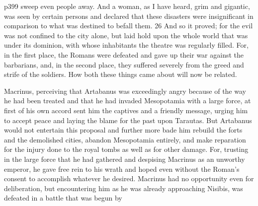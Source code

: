 p399 sweep even people away. And a woman, as I have heard, grim and gigantic, was seen by certain persons and declared that these disasters were insignificant in comparison to what was destined to befall them. 26
And so it proved; for the evil was not confined to the city alone, but laid hold upon the whole world that was under its dominion, with whose inhabitants the theatre was regularly filled. For, in the first place, the Romans were defeated and gave up their war against the barbarians, and, in the second place, they suffered severely from the greed and strife of the soldiers. How both these things came about will now be related.

Macrinus, perceiving that Artabanus was exceedingly angry because of the way he had been treated and that he had invaded Mesopotamia with a large force, at first of his own accord sent him the captives and a friendly message, urging him to accept peace and laying the blame for the past upon Tarautas. But Artabanus would not entertain this proposal and further more bade him rebuild the forts and the demolished cities, abandon Mesopotamia entirely, and make reparation for the injury done to the royal tombs as well as for other damage. For, trusting in the large force that he had gathered and despising Macrinus as an unworthy emperor, he gave free rein to his wrath and hoped even without the Roman's consent to accomplish whatever he desired. Macrinus had no opportunity even for deliberation, but encountering him as he was already approaching Nisibis, was defeated in a battle that was begun by

